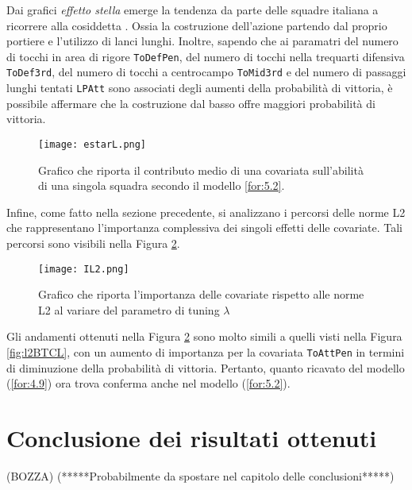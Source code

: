 Dai grafici \emph{effetto stella} emerge la tendenza da parte delle squadre italiana a ricorrere alla cosiddetta \textit{\cite{costrdalbasso}}. Ossia la costruzione dell'azione partendo dal proprio portiere e l'utilizzo di lanci lunghi. Inoltre, sapendo che ai paramatri del numero di tocchi in area di rigore \texttt{ToDefPen}, del numero di tocchi nella trequarti difensiva \texttt{ToDef3rd}, del numero di tocchi a centrocampo \texttt{ToMid3rd} e del numero di passaggi lunghi tentati \texttt{LPAtt} sono associati degli aumenti della probabilità di vittoria, è possibile affermare che la costruzione dal basso offre maggiori probabilità di vittoria.
\\
\begin{figure}[htbp]
	\begin{center}
		\texttt{[image: estarL.png]}
		\caption{Grafico che riporta il contributo medio di una covariata sull'abilità di una singola squadra secondo il modello \ref{for:5.2}.} \label{fig:effstar3}
	\end{center}
\end{figure}

Infine, come fatto nella sezione precedente, si analizzano i percorsi delle norme L2 che rappresentano l'importanza complessiva dei singoli effetti delle covariate. Tali percorsi sono visibili nella Figura \ref{fig:IL2}.

\begin{figure}[htbp]
	\begin{center}
		\texttt{[image: IL2.png]}
		\caption{Grafico che riporta l'importanza delle covariate rispetto alle norme L2 al variare del parametro di tuning $\lambda$} \label{fig:IL2}
	\end{center}
\end{figure}

Gli andamenti ottenuti nella Figura \ref{fig:IL2} sono molto simili a quelli visti nella Figura \ref{fig:l2BTCL}, con un aumento di importanza per la covariata \texttt{ToAttPen} in termini di diminuzione della probabilità di vittoria. Pertanto, quanto ricavato del modello (\ref{for:4.9}) ora trova conferma anche nel modello (\ref{for:5.2}).\\

\section{Conclusione dei risultati ottenuti}(BOZZA)
(*****Probabilmente da spostare nel capitolo delle conclusioni*****)\\


